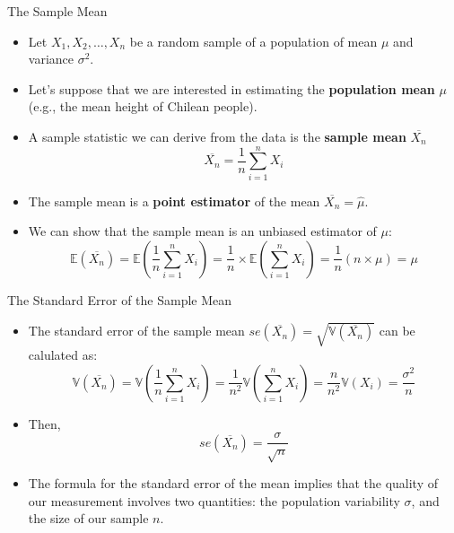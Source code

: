 \documentclass[handout]{beamer}
\begin{document}
\begin{frame}{The Sample Mean}
\scriptsize{

\begin{itemize}
 \item Let $X_1,X_2,\dots,X_n$ be a random sample of a population of mean $\mu$ and variance $\sigma^2$.
 \item Let's suppose that we are interested in estimating the \textbf{population mean} $\mu$ (e.g., the mean height of Chilean people).
 \item  A sample statistic we can derive from the data is the  \textbf{sample mean} $\overline{X_{n}}$
 \begin{displaymath}
  \overline{X_{n}}=\frac{1}{n}\sum_{i=1}^{n} X_i
 \end{displaymath}
 \item The sample mean is a \textbf{point estimator} of the mean $\overline{X_{n}} = \hat{\mu}$.

\item We can show that the sample mean is an unbiased estimator of $\mu$:
\begin{displaymath}
\mathbb{E}(\overline{X_{n}}) = \mathbb{E}(\frac 1n \sum_{i=1}^{n} X_i)  =  \frac 1n \times \mathbb{E}(\sum_{i=1}^{n} X_i) = \frac 1n (n \times \mu) = \mu  
\end{displaymath}
\end{itemize}

} 
\end{frame}

\begin{frame}{The Standard Error of the Sample Mean}
\scriptsize{

\begin{itemize}
\item The standard error of the sample mean $se(\overline{X_{n}}) = \sqrt{\mathbb{V}(\overline{X_{n}})}$ can be calulated as:
\begin{displaymath}
 \mathbb{V}(\overline{X_{n}})=\mathbb{V}(\frac 1n \sum_{i=1}^{n} X_i) = \frac{1}{n^2} \mathbb{V}(\sum_{i=1}^{n} X_i) = \frac{n}{n^2} \mathbb{V}(X_i)=\frac{\sigma^2}{n} 
\end{displaymath}

\item Then,
\begin{displaymath}
 se(\overline{X_{n}}) = \frac{\sigma}{\sqrt{n}}
\end{displaymath}





\item The formula for the standard error of the mean implies that the quality of our measurement involves two quantities: the population variability $\sigma$, and the size of our sample $n$.

\end{itemize}


} 
\end{frame}
\end{document}
